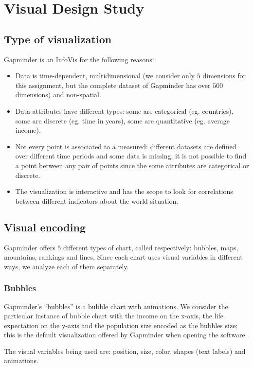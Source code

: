 \section{Visual Design Study}
\label{sec:visual_design}

\subsection{Type of visualization}
Gapminder is an InfoVis for the following reasons:
\begin{itemize}
    \item Data is time-dependent, multidimensional (we consider only $5$ dimensions for this assignment, but the complete dataset of Gapminder has over $500$ dimensions) and non-spatial.
    \item Data attributes have different types: some are categorical (eg. countries), some are discrete (eg. time in years), some are quantitative (eg. average income). 
    \item Not every point is associated to a measured: different datasets are defined over different time periods and some data is missing; it is not possible to find a point between any pair of points since the some attributes are categorical or discrete.
    \item The visualization is interactive and has the scope to look for correlations between different indicators about the world situation.
\end{itemize}


\subsection{Visual encoding}
Gapminder offers $5$ different types of chart, called respectively: bubbles, maps, mountains, rankings and lines.
Since each chart uses visual variables in different ways, we analyze each of them separately.


\subsubsection{Bubbles}
Gapminder's ``bubbles'' is a bubble chart with animations.
We consider the particular instance of bubble chart with the income on the x-axis, the life expectation on the y-axis and the population size encoded as the bubbles size; this is the default visualization offered by Gapminder when opening the software.

The visual variables being used are: position, size, color, shapes (text labels) and animations.

